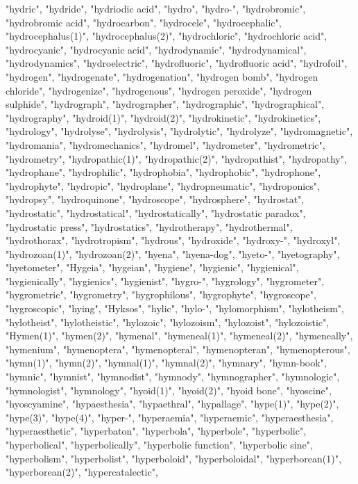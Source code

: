 "hydric",
"hydride",
"hydriodic acid",
"hydro",
"hydro-",
"hydrobromic",
"hydrobromic acid",
"hydrocarbon",
"hydrocele",
"hydrocephalic",
"hydrocephalus(1)",
"hydrocephalus(2)",
"hydrochloric",
"hydrochloric acid",
"hydrocyanic",
"hydrocyanic acid",
"hydrodynamic",
"hydrodynamical",
"hydrodynamics",
"hydroelectric",
"hydrofluoric",
"hydrofluoric acid",
"hydrofoil",
"hydrogen",
"hydrogenate",
"hydrogenation",
"hydrogen bomb",
"hydrogen chloride",
"hydrogenize",
"hydrogenous",
"hydrogen peroxide",
"hydrogen sulphide",
"hydrograph",
"hydrographer",
"hydrographic",
"hydrographical",
"hydrography",
"hydroid(1)",
"hydroid(2)",
"hydrokinetic",
"hydrokinetics",
"hydrology",
"hydrolyse",
"hydrolysis",
"hydrolytic",
"hydrolyze",
"hydromagnetic",
"hydromania",
"hydromechanics",
"hydromel",
"hydrometer",
"hydrometric",
"hydrometry",
"hydropathic(1)",
"hydropathic(2)",
"hydropathist",
"hydropathy",
"hydrophane",
"hydrophilic",
"hydrophobia",
"hydrophobic",
"hydrophone",
"hydrophyte",
"hydropic",
"hydroplane",
"hydropneumatic",
"hydroponics",
"hydropsy",
"hydroquinone",
"hydroscope",
"hydrosphere",
"hydrostat",
"hydrostatic",
"hydrostatical",
"hydrostatically",
"hydrostatic paradox",
"hydrostatic press",
"hydrostatics",
"hydrotherapy",
"hydrothermal",
"hydrothorax",
"hydrotropism",
"hydrous",
"hydroxide",
"hydroxy-",
"hydroxyl",
"hydrozoan(1)",
"hydrozoan(2)",
"hyena",
"hyena-dog",
"hyeto-",
"hyetography",
"hyetometer",
"Hygeia",
"hygeian",
"hygiene",
"hygienic",
"hygienical",
"hygienically",
"hygienics",
"hygienist",
"hygro-",
"hygrology",
"hygrometer",
"hygrometric",
"hygrometry",
"hygrophilous",
"hygrophyte",
"hygroscope",
"hygroscopic",
"hying",
"Hyksos",
"hylic",
"hylo-",
"hylomorphism",
"hylotheism",
"hylotheist",
"hylotheistic",
"hylozoic",
"hylozoism",
"hylozoist",
"hylozoistic",
"Hymen(1)",
"hymen(2)",
"hymenal",
"hymeneal(1)",
"hymeneal(2)",
"hymeneally",
"hymenium",
"hymenoptera",
"hymenopteral",
"hymenopteran",
"hymenopterous",
"hymn(1)",
"hymn(2)",
"hymnal(1)",
"hymnal(2)",
"hymnary",
"hymn-book",
"hymnic",
"hymnist",
"hymnodist",
"hymnody",
"hymnographer",
"hymnologic",
"hymnologist",
"hymnology",
"hyoid(1)",
"hyoid(2)",
"hyoid bone",
"hyoscine",
"hyoscyamine",
"hypaesthesia",
"hypaethral",
"hypallage",
"hype(1)",
"hype(2)",
"hype(3)",
"hype(4)",
"hyper-",
"hyperaemia",
"hyperaemic",
"hyperaesthesia",
"hyperaesthetic",
"hyperbaton",
"hyperbola",
"hyperbole",
"hyperbolic",
"hyperbolical",
"hyperbolically",
"hyperbolic function",
"hyperbolic sine",
"hyperbolism",
"hyperbolist",
"hyperboloid",
"hyperboloidal",
"hyperborean(1)",
"hyperborean(2)",
"hypercatalectic",
